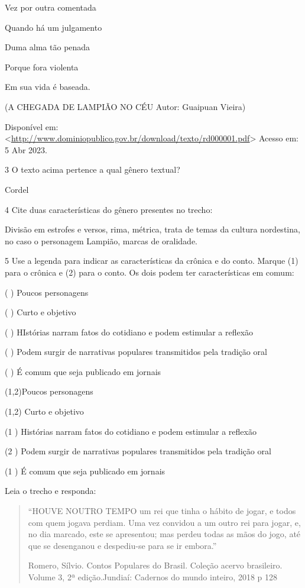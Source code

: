 {{\begin{escolha}
Vez por outra comentada

Quando há um julgamento

Duma alma tão penada

Porque fora violenta

Em sua vida é baseada.

(A CHEGADA DE LAMPIÃO NO CÉU Autor: Guaipuan Vieira)

Disponível em:
\textless{}\href{http://www.dominiopublico.gov.br/download/texto/rd000001.pdf}{\uline{http://www.dominiopublico.gov.br/download/texto/rd000001.pdf}}\textgreater{}
Acesso em: 5 Abr 2023.

\num{3} O texto acima pertence a qual gênero textual?

Cordel

\num{4} Cite duas características do gênero presentes no trecho:

Divisão em estrofes e versos, rima, métrica, trata de temas da cultura
nordestina, no caso o personagem Lampião, marcas de oralidade.

\num{5} Use a legenda para indicar as características da crônica e do conto.
  Marque (1) para o crônica e (2) para o conto. Os dois podem ter
  características em comum:

( ) Poucos personagens

( ) Curto e objetivo

( ) HIstórias narram fatos do cotidiano e podem estimular a reflexão

( ) Podem surgir de narrativas populares transmitidos pela tradição oral

( ) É comum que seja publicado em jornais

(1,2)Poucos personagens

(1,2) Curto e objetivo

(1 ) Histórias narram fatos do cotidiano e podem estimular a reflexão

(2 ) Podem surgir de narrativas populares transmitidos pela tradição
oral

(1 ) É comum que seja publicado em jornais


Leia o trecho e responda:

\begin{quote}
``HOUVE NOUTRO TEMPO um rei que tinha o hábito de jogar, e todos com
quem jogava perdiam. Uma vez convidou a um outro rei para jogar, e, no
dia marcado, este se apresentou; mas perdeu todas as mãos do jogo, até
que se desenganou e despediu-se para se ir embora.''

Romero, Sílvio. Contos Populares do Brasil. Coleção acervo brasileiro.
Volume 3, 2ª edição.Jundiaí: Cadernos do mundo inteiro, 2018 p 128
\end{quote}


\end{escolha}}}
